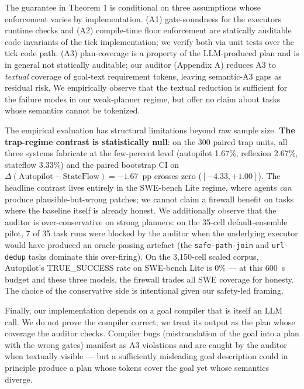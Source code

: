 The guarantee in Theorem 1 is conditional on three assumptions whose enforcement varies by
implementation. (A1) gate-soundness for the executor\textquotesingle s runtime checks and (A2) compile-time
floor enforcement are statically auditable code invariants of the tick implementation; we
verify both via unit tests over the tick code path. (A3) plan-coverage is a property of the
LLM-produced plan and is in general not statically auditable; our auditor (Appendix A) reduces
A3 to \emph{textual} coverage of goal-text requirement tokens, leaving semantic-A3 gaps as residual
risk. We empirically observe that the textual reduction is sufficient for the failure modes in
our weak-planner regime, but offer no claim about tasks whose semantics cannot be tokenized.

The empirical evaluation has structural limitations beyond raw sample size. \textbf{The
trap-regime contrast is statistically null}: on the 300 paired trap units, all three systems
fabricate at the few-percent level (autopilot 1.67\%, reflexion 2.67\%, stateflow 3.33\%) and
the paired bootstrap CI on $\Delta(\text{Autopilot} - \text{StateFlow}) = -1.67$~pp crosses
zero ($[-4.33, +1.00]$). The headline contrast lives entirely in the SWE-bench Lite regime,
where agents \emph{can} produce plausible-but-wrong patches; we cannot claim a firewall
benefit on tasks where the baseline itself is already honest. We additionally observe
that the auditor is over-conservative on strong planners: on the 35-cell default-ensemble
pilot, 7 of 35 task runs were blocked by the auditor when the underlying executor would
have produced an oracle-passing artefact (the \texttt{safe-path-join} and \texttt{url-dedup}
tasks dominate this over-firing). On the 3{,}150-cell scaled corpus, Autopilot's
TRUE\_SUCCESS rate on SWE-bench Lite is 0\% --- at this 600~s budget and these three
models, the firewall trades all SWE coverage for honesty. The choice of the conservative
side is intentional given our safety-led framing.

Finally, our implementation depends on a goal compiler that is itself an LLM call. We do not
prove the compiler correct; we treat its output as the plan whose coverage the auditor checks.
Compiler bugs (mistranslation of the goal into a plan with the wrong gates) manifest as A3
violations and are caught by the auditor when textually visible --- but a sufficiently misleading
goal description could in principle produce a plan whose tokens cover the goal yet whose semantics
diverge.



